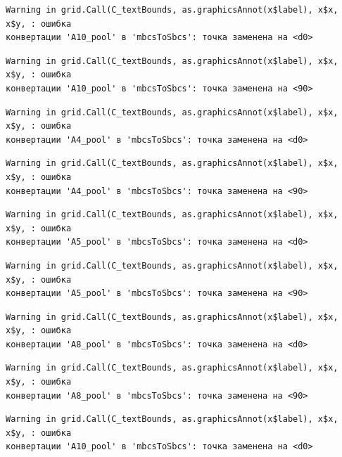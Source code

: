 \documentclass[
  letterpaper,
  DIV=11,
  numbers=noendperiod]{scrreprt}
\begin{document}
\begin{verbatim}
Warning in grid.Call(C_textBounds, as.graphicsAnnot(x$label), x$x, x$y, : ошибка
конвертации 'А10_pool' в 'mbcsToSbcs': точка заменена на <d0>
\end{verbatim}

\begin{verbatim}
Warning in grid.Call(C_textBounds, as.graphicsAnnot(x$label), x$x, x$y, : ошибка
конвертации 'А10_pool' в 'mbcsToSbcs': точка заменена на <90>
\end{verbatim}

\begin{verbatim}
Warning in grid.Call(C_textBounds, as.graphicsAnnot(x$label), x$x, x$y, : ошибка
конвертации 'А4_pool' в 'mbcsToSbcs': точка заменена на <d0>
\end{verbatim}

\begin{verbatim}
Warning in grid.Call(C_textBounds, as.graphicsAnnot(x$label), x$x, x$y, : ошибка
конвертации 'А4_pool' в 'mbcsToSbcs': точка заменена на <90>
\end{verbatim}

\begin{verbatim}
Warning in grid.Call(C_textBounds, as.graphicsAnnot(x$label), x$x, x$y, : ошибка
конвертации 'А5_pool' в 'mbcsToSbcs': точка заменена на <d0>
\end{verbatim}

\begin{verbatim}
Warning in grid.Call(C_textBounds, as.graphicsAnnot(x$label), x$x, x$y, : ошибка
конвертации 'А5_pool' в 'mbcsToSbcs': точка заменена на <90>
\end{verbatim}

\begin{verbatim}
Warning in grid.Call(C_textBounds, as.graphicsAnnot(x$label), x$x, x$y, : ошибка
конвертации 'А8_pool' в 'mbcsToSbcs': точка заменена на <d0>
\end{verbatim}

\begin{verbatim}
Warning in grid.Call(C_textBounds, as.graphicsAnnot(x$label), x$x, x$y, : ошибка
конвертации 'А8_pool' в 'mbcsToSbcs': точка заменена на <90>
\end{verbatim}

\begin{verbatim}
Warning in grid.Call(C_textBounds, as.graphicsAnnot(x$label), x$x, x$y, : ошибка
конвертации 'А10_pool' в 'mbcsToSbcs': точка заменена на <d0>
\end{verbatim}
\end{document}
